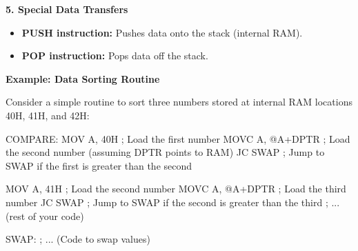 \documentclass[
]{article}
\newenvironment{Shaded}{}{}
\newcommand{\NormalTok}[1]{#1}
\begin{document}
\textbf{5. Special Data Transfers}

\begin{itemize}
\item
  \textbf{PUSH instruction:} Pushes data onto the stack (internal RAM).
\item
  \textbf{POP instruction:} Pops data off the stack.
\end{itemize}

\textbf{Example: Data Sorting Routine}

Consider a simple routine to sort three numbers stored at internal RAM
locations 40H, 41H, and 42H:

\begin{Shaded}
\begin{Highlighting}[]
\NormalTok{COMPARE: MOV A, 40H    ; Load the first number}
\NormalTok{         MOVC A, @A+DPTR ; Load the second number (assuming DPTR points to RAM)}
\NormalTok{         JC  SWAP        ; Jump to SWAP if the first is greater than the second}

\NormalTok{         MOV A, 41H     ; Load the second number}
\NormalTok{         MOVC A, @A+DPTR ; Load the third number}
\NormalTok{         JC  SWAP        ; Jump to SWAP if the second is greater than the third}
\NormalTok{         ; ... (rest of your code)}

\NormalTok{SWAP:    ; ... (Code to swap values)}
\end{Highlighting}
\end{Shaded}
\end{document}
